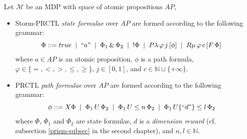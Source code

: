 \begin{definition}
Let $\mathcal{M}$ be an MDP with space of atomic propositions $AP$,
\begin{itemize}
  \item Storm-PRCTL \textit{state formulae} over $AP$ are formed according to the following grammar:
  \[
    \Phi ::= true \;\; | \;\; ``a" \;\; | \;\; \Phi_1 \, \& \, \Phi_2 \;\; | \;\; ! \Phi \;\; | \;\; P\lambda\,{\varphi}\,j \, [\phi] \;\; | \;\; R\mu\,{\varphi}\,c \,[F\, \Phi]
  \]
  where $a \in AP$ is an atomic proposition, $\phi$ is a path formula, $\varphi \in \{=, <, >, \leq, \geq \}$, $j \in [0, 1]$, and $c \in \mathbb{N} \cup \{+\infty\}$.
  \item PRCTL \textit{path formulae} over $AP$ are formed according to the following grammar:
  \[
  \phi ::= X \Phi \;\; | \;\; \Phi_1 \, U \, \Phi_2 \;\; | \;\; \Phi_1 \, U\leq n \, \Phi_2
  \;\; | \;\; \Phi_1 \, U\{ ``d" \}\leq l \, \Phi_2
  \]
  where $\Phi$, $\Phi_1$ and $\Phi_2$ are state formulae, $d$ is a \textit{dimension reward} (cf. subsection \ref{prism-subsec} in the second chapter), and $n, l \in \mathbb{N}$.
\end{itemize}
\end{definition}

%
%

